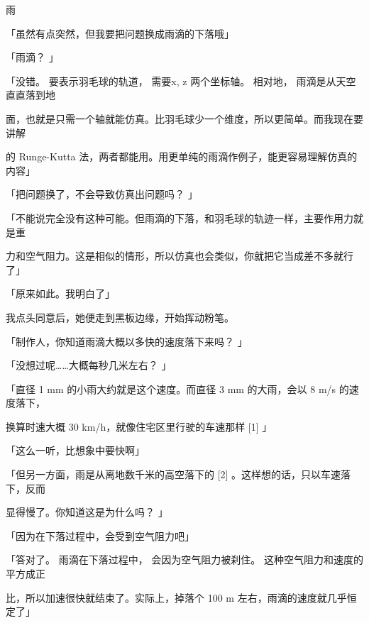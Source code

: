 雨\par
「虽然有点突然，但我要把问题换成雨滴的下落哦」\par
「雨滴？ 」\par
「没错。 要表示羽毛球的轨道， 需要x, z 两个坐标轴。 相对地， 雨滴是从天空直直落到地\par
面，也就是只需一个轴就能仿真。比羽毛球少一个维度，所以更简单。而我现在要讲解\par
的 Runge-Kutta 法，两者都能用。用更单纯的雨滴作例子，能更容易理解仿真的内容」\par
「把问题换了，不会导致仿真出问题吗？ 」\par
「不能说完全没有这种可能。但雨滴的下落，和羽毛球的轨迹一样，主要作用力就是重\par
力和空气阻力。这是相似的情形，所以仿真也会类似，你就把它当成差不多就行了」\par
「原来如此。我明白了」\par
我点头同意后，她便走到黑板边缘，开始挥动粉笔。\par
「制作人，你知道雨滴大概以多快的速度落下来吗？ 」\par
「没想过呢……大概每秒几米左右？ 」\par
「直径 1 mm 的小雨大约就是这个速度。而直径 3 mm 的大雨，会以 8 m/s 的速度落下，\par
换算时速大概 30 km/h，就像住宅区里行驶的车速那样 [1] 」\par
「这么一听，比想象中要快啊」\par
「但另一方面，雨是从离地数千米的高空落下的 [2] 。这样想的话，只以车速落下，反而\par
显得慢了。你知道这是为什么吗？ 」\par
「因为在下落过程中，会受到空气阻力吧」\par
「答对了。 雨滴在下落过程中， 会因为空气阻力被刹住。 这种空气阻力和速度的平方成正\par
比，所以加速很快就结束了。实际上，掉落个 100 m 左右，雨滴的速度就几乎恒定了」\par

